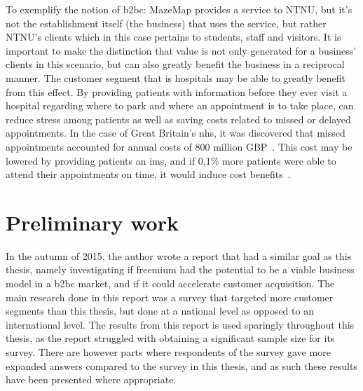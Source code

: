 To exemplify the notion of \gls{b2bc}: MazeMap provides a service to NTNU, but it's not the establishment itself (the business) that uses the service, but rather NTNU's clients which in this case pertains to students, staff and visitors. It is important to make the distinction that value is not only generated for a business' clients in this scenario, but can also greatly benefit the business in a reciprocal manner. The customer segment that is hospitals may be able to greatly benefit from this effect. By providing patients with information before they ever visit a hospital regarding where to park and where an appointment is to take place, can reduce stress among patients as well as saving costs related to missed or delayed appointments. In the case of Great Britain's \gls{nhs}, it was discovered that missed appointments accounted for annual costs of 800 million GBP~\cite{lucyjohnston2012}. This cost may be lowered by providing patients an \gls{ims}, and if 0,1\% more patients were able to attend their appointments on time, it would induce cost benefits~\cite{mazemaphosp}.


\section{Preliminary work}
In the autumn of 2015, the author wrote a report that had a similar goal as this thesis, namely investigating if freemium had the potential to be a viable business model in a \gls{b2bc} market, and if it could accelerate customer acquisition. The main research done in this report was a survey that targeted more customer segments than this thesis, but done at a national level as opposed to an international level. The results from this report is used sparingly throughout this thesis, as the report struggled with obtaining a significant sample size for its survey. There are however parts where respondents of the survey gave more expanded answers compared to the survey in this thesis, and as such these results have been presented where appropriate. 
